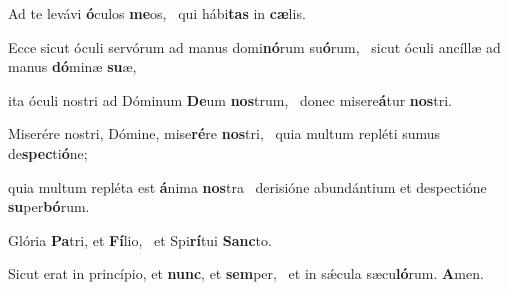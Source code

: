 \item Ad te levávi \textbf{ó}culos \textbf{me}os,~\psstar{} qui hábi\textbf{tas} in \textbf{cæ}lis.

\item Ecce sicut óculi servórum ad manus domi\textbf{nó}rum su\textbf{ó}rum,~\psstar{} sicut óculi ancíllæ ad manus \textbf{dó}minæ \textbf{su}æ,

\item ita óculi nostri ad Dóminum \textbf{De}um \textbf{nos}trum,~\psstar{} donec misere\textbf{á}tur \textbf{nos}tri.

\item Miserére nostri, Dómine, mise\textbf{ré}re \textbf{nos}tri,~\psstar{} quia multum repléti sumus de\textbf{spec}ti\textbf{ó}ne;

\item quia multum repléta est \textbf{á}nima \textbf{nos}tra~\psstar{} derisióne abundántium et despectióne \textbf{su}per\textbf{bó}rum.

\item Glória \textbf{Pa}tri, et \textbf{Fí}lio,~\psstar{} et Spi\textbf{rí}tui \textbf{Sanc}to.

\item Sicut erat in princípio, et \textbf{nunc}, et \textbf{sem}per,~\psstar{} et in sǽcula sæcu\textbf{ló}rum. \textbf{A}men.